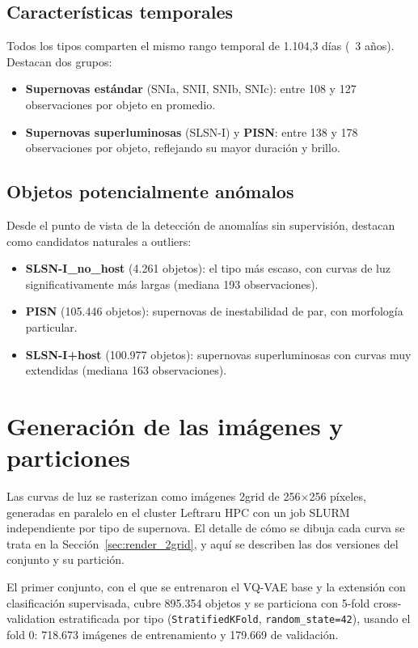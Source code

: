 \subsection{Características temporales}

Todos los tipos comparten el mismo rango temporal de 1.104,3 días (~3 años). Destacan dos grupos:

\begin{itemize}
    \item \textbf{Supernovas estándar} (SNIa, SNII, SNIb, SNIc): entre 108 y 127 observaciones por objeto en promedio.
    \item \textbf{Supernovas superluminosas} (SLSN-I) y \textbf{PISN}: entre 138 y 178 observaciones por objeto, reflejando su mayor duración y brillo.
\end{itemize}

\subsection{Objetos potencialmente anómalos}

Desde el punto de vista de la detección de anomalías sin supervisión, destacan como candidatos naturales a outliers:

\begin{itemize}
    \item \textbf{SLSN-I\_no\_host} (4.261 objetos): el tipo más escaso, con curvas de luz significativamente más largas (mediana 193 observaciones).
    \item \textbf{PISN} (105.446 objetos): supernovas de inestabilidad de par, con morfología particular.
    \item \textbf{SLSN-I+host} (100.977 objetos): supernovas superluminosas con curvas muy extendidas (mediana 163 observaciones).
\end{itemize}

\section{Generación de las imágenes y particiones}

Las curvas de luz se rasterizan como imágenes 2grid de 256×256 píxeles, generadas en paralelo en el cluster Leftraru HPC con un job SLURM independiente por tipo de supernova. El detalle de cómo se dibuja cada curva se trata en la Sección~\ref{sec:render_2grid}, y aquí se describen las dos versiones del conjunto y su partición.

El primer conjunto, con el que se entrenaron el VQ-VAE base y la extensión con clasificación supervisada, cubre 895.354 objetos y se particiona con 5-fold cross-validation estratificada por tipo (\texttt{StratifiedKFold}, \texttt{random\_state=42}), usando el fold 0: 718.673 imágenes de entrenamiento y 179.669 de validación.

